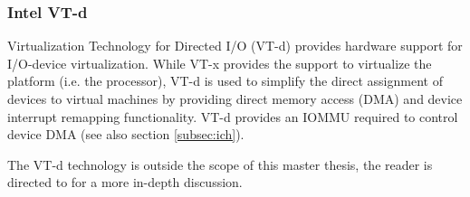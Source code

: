 \subsubsection{Intel VT-d}\label{subsubsec:vtd}
Virtualization Technology for Directed I/O (VT-d) provides hardware
support for I/O-device virtualization. While VT-x provides the support to
virtualize the platform (i.e. the processor), VT-d is used to simplify the
direct assignment of devices to virtual machines by providing direct memory
access (DMA) and device interrupt remapping functionality. VT-d
provides an IOMMU required to control device DMA (see also section
\ref{subsec:ich}).

The VT-d technology is outside the scope of this master thesis, the reader is
directed to \cite{IntelVTd} for a more in-depth discussion.
